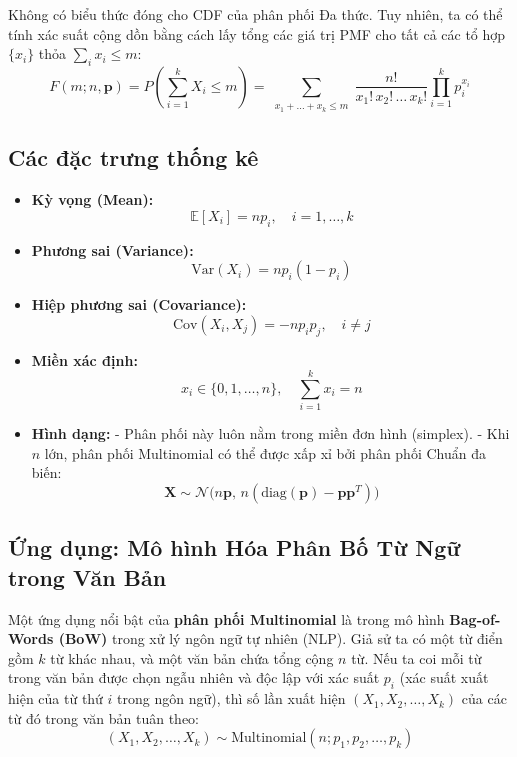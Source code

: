Không có biểu thức đóng cho CDF của phân phối Đa thức.  
Tuy nhiên, ta có thể tính xác suất cộng dồn bằng cách lấy tổng các giá trị PMF cho tất cả các tổ hợp $\{x_i\}$ thỏa $\sum_i x_i \le m$:
\[
F(m; n, \mathbf{p}) = P\left(\sum_{i=1}^{k} X_i \le m\right) = 
\sum_{\substack{x_1 + \dots + x_k \le m}} 
\frac{n!}{x_1! \, x_2! \, \dots \, x_k!} 
\prod_{i=1}^{k} p_i^{x_i}
\]


\subsection{Các đặc trưng thống kê}

\begin{itemize}
  \item \textbf{Kỳ vọng (Mean):}  
  \[
    \mathbb{E}[X_i] = n p_i, \quad i = 1, \dots, k
  \]
  \item \textbf{Phương sai (Variance):}  
  \[
    \mathrm{Var}(X_i) = n p_i (1 - p_i)
  \]
  \item \textbf{Hiệp phương sai (Covariance):}  
  \[
    \mathrm{Cov}(X_i, X_j) = -n p_i p_j, \quad i \ne j
  \]
  \item \textbf{Miền xác định:}  
  \[
    x_i \in \{0, 1, \dots, n\}, \quad \sum_{i=1}^{k} x_i = n
  \]
  \item \textbf{Hình dạng:}  
  - Phân phối này luôn nằm trong miền đơn hình (simplex).  
  - Khi $n$ lớn, phân phối Multinomial có thể được xấp xỉ bởi phân phối Chuẩn đa biến:
  \[
  \mathbf{X} \sim \mathcal{N}\big(n\mathbf{p},\, n(\mathrm{diag}(\mathbf{p}) - \mathbf{p}\mathbf{p}^T)\big)
  \]
\end{itemize}

\subsection*{Ứng dụng: Mô hình Hóa Phân Bố Từ Ngữ trong Văn Bản}

Một ứng dụng nổi bật của \textbf{phân phối Multinomial} là trong mô hình \textbf{Bag-of-Words (BoW)} trong xử lý ngôn ngữ tự nhiên (NLP).  
Giả sử ta có một từ điển gồm $k$ từ khác nhau, và một văn bản chứa tổng cộng $n$ từ.  
Nếu ta coi mỗi từ trong văn bản được chọn ngẫu nhiên và độc lập với xác suất $p_i$ (xác suất xuất hiện của từ thứ $i$ trong ngôn ngữ),  
thì số lần xuất hiện $(X_1, X_2, \dots, X_k)$ của các từ đó trong văn bản tuân theo:
\[
(X_1, X_2, \dots, X_k) \sim \mathrm{Multinomial}(n; p_1, p_2, \dots, p_k)
\]

